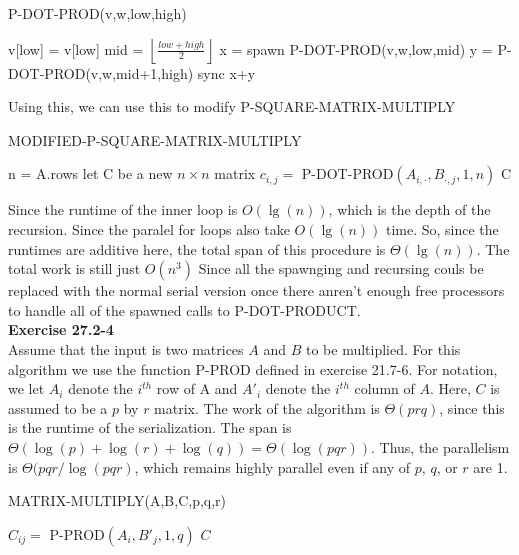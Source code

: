 \documentclass{article}
\begin{document}
\begin{algorithm}
\caption{P-DOT-PROD(v,w,low,high)}
\begin{algorithmic}
\State \Return  v[low] = v[low]
\EndIf
\State mid = $\left\lfloor \frac{low+high}{2}\right\rfloor$
\State x = spawn P-DOT-PROD(v,w,low,mid)
\State y = P-DOT-PROD(v,w,mid+1,high)
\State sync
\State \Return x+y
\end{algorithmic}
\end{algorithm}

Using this, we can use this to modify P-SQUARE-MATRIX-MULTIPLY

\begin{algorithm}
\caption{MODIFIED-P-SQUARE-MATRIX-MULTIPLY}
\begin{algorithmic}
\State n = A.rows
\State let C be a new $n\times n$ matrix
\State $c_{i,j} =$ P-DOT-PROD$(A_{i,\cdot},B_{\cdot,j},1,n)$
\EndParFor
\EndParFor
\State \Return C
\end{algorithmic}
\end{algorithm}

Since the runtime of the inner loop is $O(\lg(n))$, which is the depth of the recursion. Since the paralel for loops also take $O(\lg(n))$ time. So, since the runtimes are additive here, the total span of this procedure is $\Theta(\lg(n))$. The total work is still just $O(n^3)$ Since all the spawnging and recursing couls be replaced with the normal serial version once there anren't enough free processors to handle all of the spawned calls to P-DOT-PRODUCT. \\

\noindent\textbf{Exercise 27.2-4}\\

Assume that the input is two matrices $A$ and $B$ to be multiplied.  For this algorithm we use the function P-PROD defined in exercise 21.7-6.  For notation, we let $A_i$ denote the $i^{th}$ row of A and $A'_i$ denote the $i^{th}$ column of $A$.  Here, $C$ is assumed to be a $p$ by $r$ matrix. The work of the algorithm is $\Theta(prq)$, since this is the runtime of the serialization.  The span is $\Theta(\log(p) + \log(r) + \log(q)) = \Theta(\log(pqr))$.  Thus, the parallelism is $ \Theta(pqr / \log(pqr)$, which remains highly parallel even if any of $p$, $q$, or $r$ are 1.\\

\begin{algorithm}
\caption{MATRIX-MULTIPLY(A,B,C,p,q,r)}
\begin{algorithmic}[1]
		\State $C_{ij} = $ P-PROD$(A_i, B'_j, 1,q)$
	\EndParFor
\EndParFor
\State \Return $C$
\end{algorithmic}
\end{algorithm}
\end{document}
